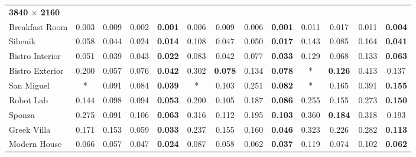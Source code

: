 \begin{table*}[t]
\begin{tabular}{l cccc|cccc|cccc}
\hline
\textbf{3840 $\times$ 2160}   & & & & & & & & & & & & \\
Breakfast Room                & 0.003           & 0.009          & 0.002          & \textbf{0.001}          & 0.006           & 0.009          & 0.006          & \textbf{0.001}          & 0.011           & 0.017          & 0.011          & \textbf{0.004}          \\
Sibenik                       & 0.058           & 0.044          & 0.024          & \textbf{0.014}          & 0.108           & 0.047          & 0.050          & \textbf{0.017}          & 0.143           & 0.085          & 0.164          & \textbf{0.041}          \\
Bistro Interior               & 0.051           & 0.039          & 0.043          & \textbf{0.022}          & 0.083           & 0.042          & 0.077          & \textbf{0.033}          & 0.129           & 0.068          & 0.133          & \textbf{0.063}          \\
Bistro Exterior               & 0.200           & 0.057          & 0.076          & \textbf{0.042}          & 0.302           & \textbf{0.078} & 0.134          & \textbf{0.078}          & *               & \textbf{0.126} & 0.413          & 0.137                   \\
San Miguel                    & *               & 0.091          & 0.084          & \textbf{0.039}          & *               & 0.103          & 0.251          & \textbf{0.082}          & *               & 0.165          & 0.391          & \textbf{0.155}          \\
Robot Lab                     & 0.144           & 0.098          & 0.094          & \textbf{0.053}          & 0.200           & 0.105          & 0.187          & \textbf{0.086}          & 0.255           & 0.155          & 0.273          & \textbf{0.150}          \\
Sponza                        & 0.275           & 0.091          & 0.106          & \textbf{0.063}          & 0.316           & 0.112          & 0.195          & \textbf{0.103}          & 0.360           & \textbf{0.184} & 0.318          & 0.193                   \\
Greek Villa                   & 0.171           & 0.153          & 0.059          & \textbf{0.033}          & 0.237           & 0.155          & 0.160          & \textbf{0.046}          & 0.323           & 0.226          & 0.282          & \textbf{0.113}          \\
Modern House                  & 0.066           & 0.057          & 0.047          & \textbf{0.024}          & 0.087           & 0.058          & 0.062          & \textbf{0.037}          & 0.119           & 0.074          & 0.102          & \textbf{0.062}          \\

\end{tabular}
\end{table*}
